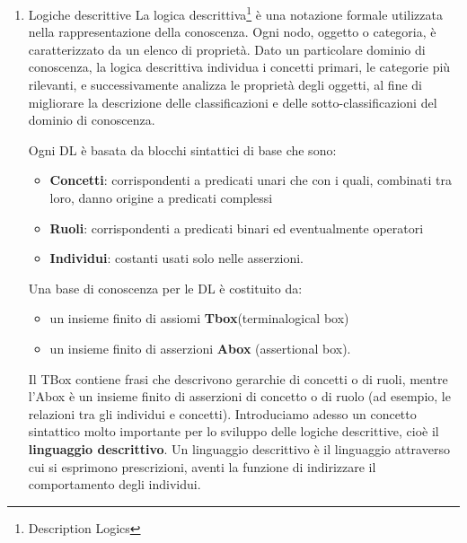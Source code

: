 \documentclass[a4paper,11pt]{article}
\begin{document}
\begin{enumerate}
\begin{enumerate}[label*=\arabic*.]
		\newpage
		\item {Logiche descrittive}\newline
La logica descrittiva\footnote{Description Logics} è una notazione formale utilizzata nella rappresentazione della conoscenza. Ogni nodo, oggetto o categoria, è caratterizzato da un elenco di proprietà.
Dato un particolare dominio di conoscenza, la logica descrittiva individua i concetti primari, le categorie più rilevanti, e successivamente analizza le proprietà degli oggetti, al fine di migliorare la descrizione delle classificazioni e delle sotto-classificazioni del dominio di conoscenza. 

Ogni DL è basata da blocchi sintattici di base che sono:
\begin{itemize}
\item \textbf{Concetti}: corrispondenti a predicati unari che con i quali, combinati tra loro, danno origine a predicati complessi 
\item \textbf{Ruoli}: corrispondenti a predicati binari ed eventualmente operatori
\item \textbf{Individui}: costanti usati solo nelle asserzioni.
\end{itemize}


Una base di conoscenza per le DL è costituito da:
\begin{itemize}
\item un insieme finito di assiomi \textbf{Tbox}(terminalogical box) 
\item un insieme finito di asserzioni \textbf{Abox} (assertional box).
\end{itemize}

Il TBox contiene frasi che descrivono gerarchie di concetti o di ruoli, mentre l'Abox è un insieme finito di asserzioni di concetto o di ruolo (ad esempio, le relazioni tra gli individui e concetti).
Introduciamo adesso un concetto sintattico molto importante per lo sviluppo delle logiche descrittive, cioè il \textbf{linguaggio descrittivo}.
Un linguaggio descrittivo è il linguaggio attraverso cui si esprimono prescrizioni, aventi la funzione di indirizzare il comportamento degli individui.


\end{enumerate}
\end{enumerate}
\end{document}
